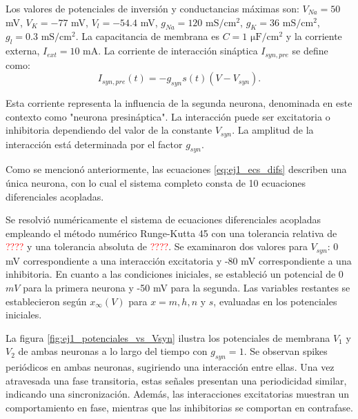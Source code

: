 \documentclass[aps,prb,twocolumn,superscriptaddress,floatfix,longbibliography]{revtex4-2}
\newcounter{para}
\begin{document}
Los valores de potenciales de inversión y conductancias máximas son: $V_{Na} = 50$ mV, $V_K = -77$ mV, $V_l = -54.4$ mV, $g_{Na} = 120$ $\mathrm{mS/cm^2}$, $g_K = 36$ $\mathrm{mS/cm^2}$, $g_l = 0.3$ $\mathrm{mS/cm^2}$. La capacitancia de membrana es $C = 1$ $\mathrm{\mu F/cm^2}$ y la corriente externa, $I_{ext} = 10$ mA. La corriente de interacción sináptica $I_{syn, pre}$ se define como:
\[I_{syn, pre}(t) = -g_{syn} s(t) (V - V_{syn}).\]

Esta corriente representa la influencia de la segunda neurona, denominada en este contexto como "neurona presináptica". La interacción puede ser excitatoria o inhibitoria dependiendo del valor de la constante $V_{syn}$. La amplitud de la interacción está determinada por el factor $g_{syn}$.

Como se mencionó anteriormente, las ecuaciones \ref{eq:ej1_ecs_difs} describen una única neurona, con lo cual el sistema completo consta de 10 ecuaciones diferenciales acopladas.

Se resolvió numéricamente el sistema de ecuaciones diferenciales acopladas empleando el método numérico Runge-Kutta 45 con una tolerancia relativa de \textcolor{red}{????} y una tolerancia absoluta de \textcolor{red}{????}. Se examinaron dos valores para \(V_{syn}\): 0 mV correspondiente a una interacción excitatoria y -80 mV correspondiente a una inhibitoria. En cuanto a las condiciones iniciales, se estableció un potencial de 0 \(mV\) para la primera neurona y -50 mV para la segunda. Las variables restantes se establecieron según \(x_\infty(V)\) para \(x = m, h, n\) y \(s\), evaluadas en los potenciales iniciales.

La figura \ref{fig:ej1_potenciales_vs_Vsyn} ilustra los potenciales de membrana \(V_1\) y \(V_2\) de ambas neuronas a lo largo del tiempo con \(g_{syn} = 1\). Se observan spikes periódicos en ambas neuronas, sugiriendo una interacción entre ellas. Una vez atravesada una fase transitoria, estas señales presentan una periodicidad similar, indicando una sincronización. Además, las interacciones excitatorias muestran un comportamiento en fase, mientras que las inhibitorias se comportan en contrafase.
\end{document}
